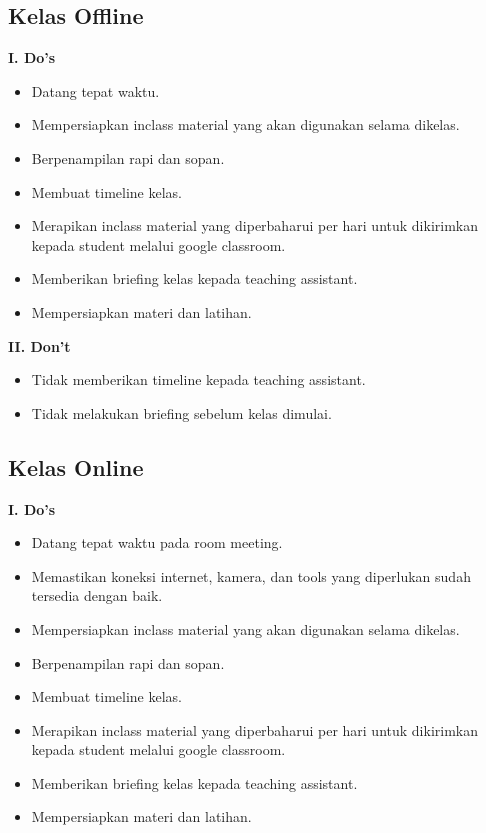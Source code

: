 \documentclass[
]{book}
\providecommand{\tightlist}{%
  \setlength{\itemsep}{0pt}\setlength{\parskip}{0pt}}
\begin{document}
\hypertarget{kelas-offline-3}{%
\subsection{Kelas Offline}\label{kelas-offline-3}}

\textbf{I. Do's}

\begin{itemize}
\tightlist
\item
  Datang tepat waktu.
\item
  Mempersiapkan inclass material yang akan digunakan selama dikelas.
\item
  Berpenampilan rapi dan sopan.
\item
  Membuat timeline kelas.
\item
  Merapikan inclass material yang diperbaharui per hari untuk dikirimkan kepada student melalui google classroom.
\item
  Memberikan briefing kelas kepada teaching assistant.
\item
  Mempersiapkan materi dan latihan.
\end{itemize}

\textbf{II. Don't}

\begin{itemize}
\tightlist
\item
  Tidak memberikan timeline kepada teaching assistant.
\item
  Tidak melakukan briefing sebelum kelas dimulai.
\end{itemize}

\hypertarget{kelas-online-3}{%
\subsection{Kelas Online}\label{kelas-online-3}}

\textbf{I. Do's}

\begin{itemize}
\tightlist
\item
  Datang tepat waktu pada room meeting.
\item
  Memastikan koneksi internet, kamera, dan tools yang diperlukan sudah tersedia dengan baik.
\item
  Mempersiapkan inclass material yang akan digunakan selama dikelas.
\item
  Berpenampilan rapi dan sopan.
\item
  Membuat timeline kelas.
\item
  Merapikan inclass material yang diperbaharui per hari untuk dikirimkan kepada student melalui google classroom.
\item
  Memberikan briefing kelas kepada teaching assistant.
\item
  Mempersiapkan materi dan latihan.
\end{itemize}
\end{document}
